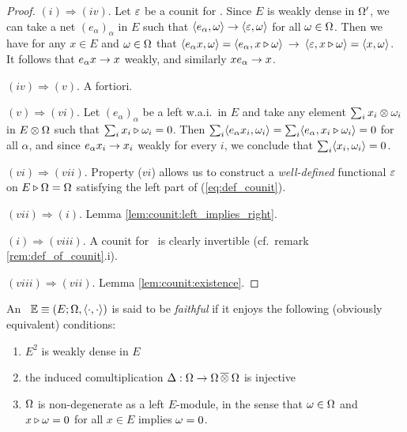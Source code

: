 \begin{proof}
  $(i) \Rightarrow (iv)$\@.
  Let $\varepsilon$ be a counit for \EE\@. Since $E$ is weakly dense in $\Omega'$,
  we can take a net $(e_\alpha)_{\alpha}$ in $E$ such that
  $\langle e_\alpha,\omega \rangle \rightarrow \langle \varepsilon,\omega \rangle$
  for all $\omega \in \Omega$. Then we have for any $x\in E$ and $\omega \in \Omega$ that
  $\langle e_\alpha x,\omega \rangle = \langle e_\alpha,x\triangleright\omega \rangle
        \: \rightarrow \: \langle \varepsilon,x\triangleright\omega \rangle = \langle x,\omega \rangle$.
  It follows that $e_\alpha x \rightarrow x$ weakly, and similarly $x e_\alpha \rightarrow x$.
\vspace{1ex}

  $(iv) \Rightarrow (v)$\@. A fortiori.
\vspace{1ex}

  $(v) \Rightarrow (vi)$\@.
  Let $(e_\alpha)_{\alpha}$ be a left w.a.i.\ in $E$ and take any element
  $\sum_i x_i\otimes\omega_i$ in $E\otimes\Omega$ such that $ \sum_i x_i\triangleright\omega_i = 0$. Then
  $\sum_i \langle e_\alpha x_i,\omega_i \rangle = \sum_i \langle e_\alpha,x_i\triangleright\omega_i \rangle = 0$
  for all $\alpha$, and since $e_\alpha x_i \rightarrow x_i$ weakly for every $i$,
  we conclude that $\sum_i \langle x_i,\omega_i \rangle = 0$.
\vspace{1ex}

  $(vi) \Rightarrow (vii)$\@.
  Property ($vi$) allows us to construct a {\em well-defined\/} functional $\varepsilon$
  on $E\triangleright\Omega = \Omega$ satisfying the left part of (\ref{eq:def_counit}).
\vspace{1ex}

  $(vii) \Rightarrow (i)$\@.
  Lemma \ref{lem:counit:left_implies_right}.
\vspace{1ex}

  $(i) \Rightarrow (viii)$\@.
  A counit for \EE\ is clearly \EEdash invertible
  (cf.\ remark \ref{rem:def_of_counit}.i).
\vspace{1ex}

  $(viii) \Rightarrow (vii)$\@.
  Lemma \ref{lem:counit:existence}\@.
\end{proof}


\begin{defn*} \label{def:faithful_context} \rm
An \context\ $\mathbb{E} \equiv (E; \Omega, \langle\cdot, \cdot\rangle)$ is said to be {\em faithful\/}
if it enjoys the following (obviously equivalent) conditions:
  \begin{enumerate}
    \item $E^2$ is weakly dense in $E$
    \item the induced comultiplication
          $\Delta: \Omega \rightarrow \Omega \,\overline{\otimes}\: \Omega$ is injective
    \item $\Omega$ is non-degenerate as a left $E$-module, in the sense that
          $\omega \in \Omega$ and $x \triangleright \omega = 0$ for all $x\in E$ implies $\omega=0$.
  \end{enumerate}
\end{defn*}


